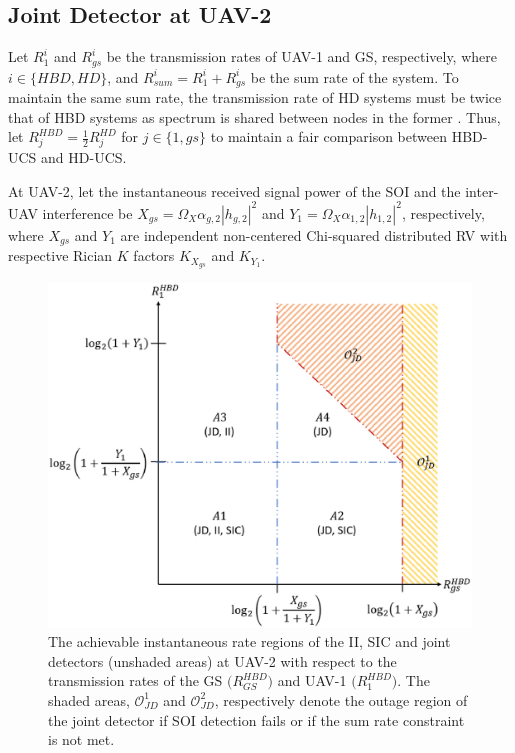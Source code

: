 \subsection{Joint Detector at UAV-2}
Let $R^{i}_{1}$ and $R^{i}_{gs}$ be the transmission rates of UAV-1 and GS, respectively, where $i \in \{HBD,HD\}$, and $R^{i}_{sum} = R^{i}_{1}+R^{i}_{gs}$ be the sum rate of the system. To maintain the same sum rate, the transmission rate of HD systems must be twice that of HBD systems as spectrum is shared between nodes in the former \cite{ahmed2015all,kwon2010optimal}. Thus, let $R_{j}^{HBD}=\frac{1}{2}R_{j}^{HD}$ for $ j \in \{1, gs\}$ to maintain a fair comparison between HBD-UCS and HD-UCS.

At UAV-2, let the instantaneous received signal power of the SOI and the inter-UAV interference be $X_{gs} = \Omega_{X}\alpha_{g,2}|h_{g,2}|^2$ and $Y_{1}=\Omega_{X}\alpha_{1,2}|h_{1,2}|^2$, respectively, where $X_{gs}$ and $Y_{1}$ are independent non-centered Chi-squared distributed RV with respective Rician $K$ factors $K_{X_{gs}}$ and $K_{Y_1}$.

\begin{figure} [tbp]
\centering
\vspace{-0.5cm}
\includegraphics [width=0.6\columnwidth]{chap4_fig/rate_regions.eps} 
\vspace{-0.5cm}
\caption{The achievable instantaneous rate regions of the II, SIC and joint detectors (unshaded areas) at UAV-2 with respect to the transmission rates of the GS $\big(R_{GS}^{HBD}\big)$ and UAV-1 $\big(R_{1}^{HBD}\big)$. The shaded areas, $\mathcal{O}_{JD}^{1}$ and $\mathcal{O}_{JD}^{2}$, respectively denote the outage region of the joint detector if SOI detection fails or if the sum rate constraint is not met.}
\vspace{-0.25cm}
\label{fig:JD_HBD_UCS_rate_regions}
\end{figure}

